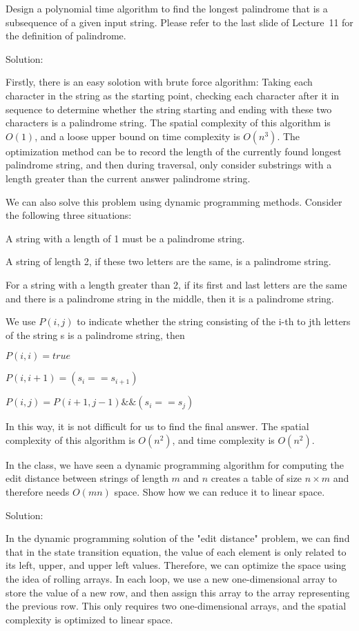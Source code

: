 \documentclass{oxmathproblems}
\begin{document}
\begin{questions}
\miquestion[25]
Design a polynomial time algorithm to find the longest palindrome that is a subsequence of a given input string.
Please refer to the last slide of Lecture~11 for the definition of palindrome.

Solution:

Firstly, there is an easy solotion with brute force algorithm: Taking each character in the string as the starting point, checking each character after it in sequence to determine whether the string starting and ending with these two characters is a palindrome string. The spatial complexity of this algorithm is $O(1)$, and a loose upper bound on time complexity is $O(n^3)$. The optimization method can be to record the length of the currently found longest palindrome string, and then during traversal, only consider substrings with a length greater than the current answer palindrome string.

We can also solve this problem using dynamic programming methods. Consider the following three situations:

A string with a length of 1 must be a palindrome string.

A string of length 2, if these two letters are the same, is a palindrome string.

For a string with a length greater than 2, if its first and last letters are the same and there is a palindrome string in the middle, then it is a palindrome string.

We use $P(i,j)$ to indicate whether the string consisting of the i-th to jth letters of the string s is a palindrome string, then

$P(i,i) = true$

$P(i,i+1) = (s_i == s_{i+1})$

$P(i,j) = P(i+1,j-1) \&\& (s_i == s_j)$

In this way, it is not difficult for us to find the final answer. The spatial complexity of this algorithm is $O(n^2)$, and time complexity is $O(n^2)$.

\miquestion[25]
In the class, we have seen a dynamic programming algorithm for computing the edit distance between strings of length $m$ and $n$ creates a table of size $n\times m$ and therefore needs $O(mn)$ space.
Show how we can reduce it to linear space.

Solution:

In the dynamic programming solution of the "edit distance" problem, we can find that in the state transition equation, the value of each element is only related to its left, upper, and upper left values. Therefore, we can optimize the space using the idea of rolling arrays. In each loop, we use a new one-dimensional array to store the value of a new row, and then assign this array to the array representing the previous row. This only requires two one-dimensional arrays, and the spatial complexity is optimized to linear space.



\end{questions}
\end{document}
